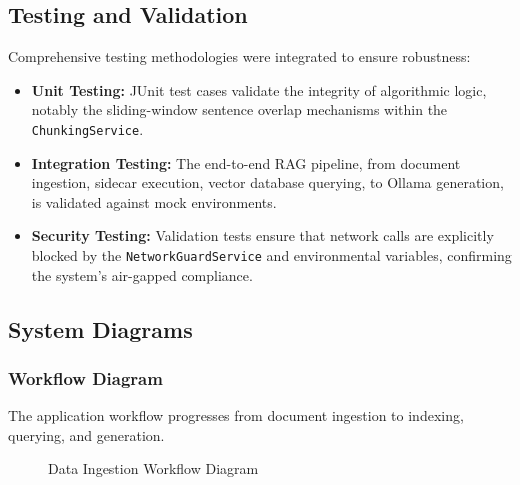 \subsection{Testing and Validation}
Comprehensive testing methodologies were integrated to ensure robustness:
\begin{itemize}
    \item \textbf{Unit Testing:} JUnit test cases validate the integrity of algorithmic logic, notably the sliding-window sentence overlap mechanisms within the \texttt{ChunkingService}.
    \item \textbf{Integration Testing:} The end-to-end RAG pipeline, from document ingestion, sidecar execution, vector database querying, to Ollama generation, is validated against mock environments.
    \item \textbf{Security Testing:} Validation tests ensure that network calls are explicitly blocked by the \texttt{NetworkGuardService} and environmental variables, confirming the system's air-gapped compliance.
\end{itemize}


\subsection{System Diagrams}

\subsubsection{Workflow Diagram}
The application workflow progresses from document ingestion to indexing, querying, and generation.
\begin{figure}[htbp]
\centering
{}
\caption{Data Ingestion Workflow Diagram}
\label{fig:workflow}
\end{figure}

